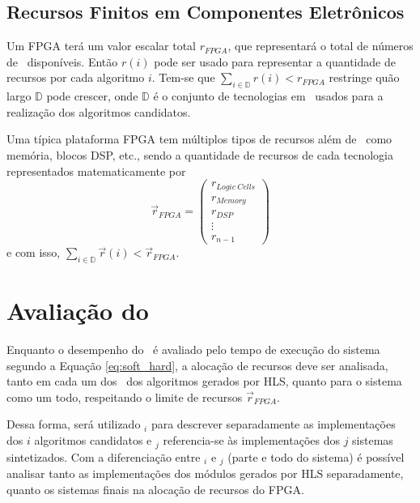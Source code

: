         \subsection{Recursos Finitos em Componentes Eletrônicos} \label{sec:recursos}
        
            Um FPGA terá um valor escalar total $ r_{FPGA} $, que representará o total de números de \luts\ disponíveis.
            Então $ r(i) $ pode ser usado para representar a quantidade de recursos por cada algoritmo $ i $.
            Tem-se que $ \sum_{i \in \mathbb{D}} r(i) < r_{FPGA} $ restringe quão largo $ \mathbb{D} $ pode crescer, onde $ \mathbb{D} $ é o conjunto de tecnologias em \hardware\ usados para a realização dos algoritmos candidatos.
            
            Uma típica plataforma FPGA tem múltiplos tipos de recursos além de \luts\ como memória, blocos DSP, etc., sendo a quantidade de recursos de cada tecnologia representados matematicamente por
            \begin{equation}
                \vec{r}_{FPGA} =
                \begin{pmatrix}
                r_{Logic\ Cells} \\
                r_{Memory}\\
                r_{DSP}\\
                \vdots \\
                r_{n-1}
                \end{pmatrix}
            \end{equation}
            e com isso,
            $ \sum_{i \in \mathbb{D}} \vec{r}(i) < \vec{r}_{FPGA} $.

    \section{Avaliação do \Wearable}
        Enquanto o desempenho do \wearable\ é avaliado pelo tempo de execução do sistema segundo a Equação \ref{eq:soft_hard}, a alocação de recursos deve ser analisada, tanto em cada um dos \hardwares\ dos algoritmos gerados por HLS, quanto para o sistema como um todo, respeitando o limite de recursos $ \vec{r}_{FPGA} $.
        
        Dessa forma, será utilizado \A$ _i $ para descrever separadamente as implementações dos $ i $ algoritmos candidatos e \Ss$ _j $ referencia-se às implementações dos $ j $ sistemas sintetizados.
        Com a diferenciação entre \A$ _i $ e \Ss$ _j $ (parte e todo do sistema) é possível analisar tanto as implementações dos módulos gerados por HLS separadamente, quanto os sistemas finais na alocação de recursos do FPGA.

